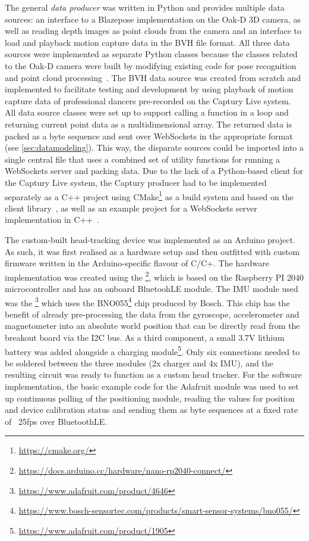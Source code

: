 The general \emph{data producer} was written in Python and provides multiple data sources: an interface to a Blazepose implementation on the Oak-D \ac{3D} camera, as well as reading depth images as point clouds from the camera and an interface to load and playback motion capture data in the \ac{BVH} file format.
All three data sources were implemented as separate Python classes because the classes related to the Oak-D camera were built by modifying existing code for pose recognition~\parencite{githubDepthAiBlazePose} and point cloud processing~\parencite{githubDepthAiPointcloud}.
The \ac{BVH} data source was created from scratch and implemented to facilitate testing and development by using playback of motion capture data of professional dancers pre-recorded on the Captury Live system.
All data source classes were set up to support calling a function in a loop and returning current point data as a multidimensional array.
The returned data is packed as a byte sequence and sent over WebSockets in the appropriate format (see \autoref{sec:datamodeling}).
This way, the disparate sources could be imported into a single central file that uses a combined set of utility functions for running a WebSockets server and packing data.
Due to the lack of a Python-based client for the Captury Live system, the Captury producer had to be implemented separately as a C++ project using CMake\footnote{\url{https://cmake.org/}} as a build system and based on the  client library~\parencite{githubRemoteCaptury}, as well as an example project for a WebSockets server implementation in C++~\parencite{githubCppWebSocketsDemo}.

The custom-built head-tracking device was implemented as an Arduino project.
As such, it was first realised as a hardware setup and then outfitted with custom firmware written in the Arduino-specific flavour of C/C+.
The hardware implementation was created using the \footnote{\url{https://docs.arduino.cc/hardware/nano-rp2040-connect/}}, which is based on the Raspberry PI 2040 microcontroller and has an onboard BluetoohLE module.
The \ac{IMU} module used was the \footnote{\url{https://www.adafruit.com/product/4646}} which uses the BNO055\footnote{\url{https://www.bosch-sensortec.com/products/smart-sensor-systems/bno055/}} chip produced by Bosch.
This chip has the benefit of already pre-processing the data from the gyroscope, accelerometer and magnetometer into an absolute world position that can be directly read from the breakout board via the \ac{I2C} bus.
As a third component, a small 3.7V lithium battery was added alongside a charging module\footnote{\url{https://www.adafruit.com/product/1905}}.
Only six connections needed to be soldered between the three modules (2x charger and 4x \ac{IMU}), and the resulting circuit was ready to function as a custom head tracker.
For the software implementation, the basic example code for the Adafruit module was used to set up continuous polling of the positioning module, reading the values for position and device calibration status and sending them as byte sequences at a fixed rate of ~25fps over BluetoothLE\@.
